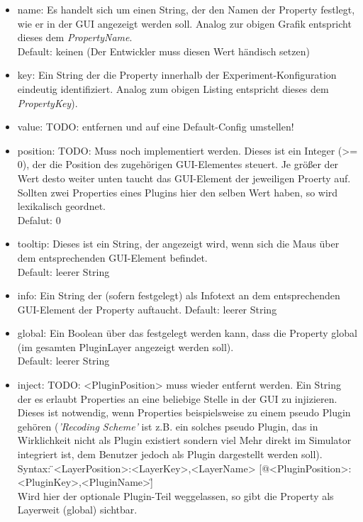 \documentclass[a4paper, 11pt]{article} %
\begin{document}
\begin{itemize}
	\item name: Es handelt sich um einen String, der den Namen der Property festlegt, wie er in der GUI angezeigt werden soll. Analog zur obigen Grafik entspricht dieses dem \emph{PropertyName}.\\
	Default: keinen (Der Entwickler muss diesen Wert händisch setzen)
	\item key: Ein String der die Property innerhalb der Experiment-Konfiguration eindeutig identifiziert. Analog zum obigen Listing entspricht dieses dem \emph{PropertyKey}).
	\item value: TODO: entfernen und auf eine Default-Config umstellen!
	\item position: TODO: Muss noch implementiert werden. Dieses ist ein Integer (>= 0), der die Position des zugehörigen GUI-Elementes steuert. Je größer der Wert desto weiter unten taucht das GUI-Element der jeweiligen Proerty auf. Sollten zwei Properties eines Plugins hier den selben Wert haben, so wird lexikalisch geordnet.\\
	Defalut: 0 
	\item tooltip: Dieses ist ein String, der angezeigt wird, wenn sich die Maus über dem entsprechenden GUI-Element befindet.\\
	Default: leerer String 
	\item info: Ein String der (sofern festgelegt) als Infotext an dem entsprechenden GUI-Element der Property auftaucht.  
	Default: leerer String
	\item global: Ein Boolean über das festgelegt werden kann, dass die Property global (im gesamten PluginLayer angezeigt werden soll).\\
	Default: leerer String
	\item inject: TODO: <PluginPosition> muss wieder entfernt werden. Ein String der es erlaubt Properties an eine beliebige Stelle in der GUI zu injizieren. Dieses ist notwendig, wenn Properties beispielsweise zu einem pseudo Plugin gehören (\emph{'Recoding Scheme'} ist z.B. ein solches pseudo Plugin, das in Wirklichkeit nicht als Plugin existiert sondern viel Mehr direkt im Simulator integriert ist, dem Benutzer jedoch als Plugin dargestellt werden soll). \\
	Syntax: \"{}<LayerPosition>:<LayerKey>,<LayerName> [@<PluginPosition>:<PluginKey>,<PluginName>]\"{}\\
	Wird hier der optionale Plugin-Teil weggelassen, so gibt die Property als Layerweit (global) sichtbar.\\

\end{itemize}
\end{document}
